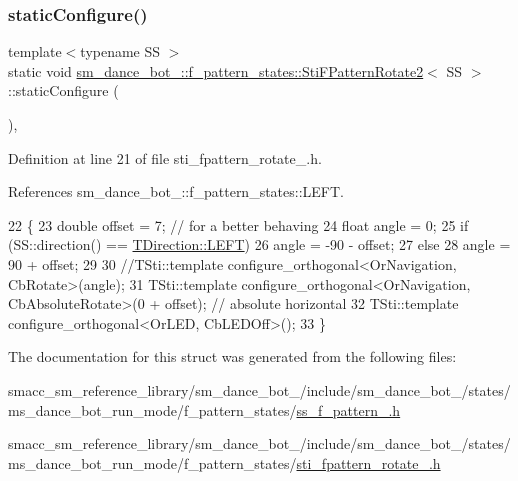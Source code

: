 \subsubsection{\texorpdfstring{static\+Configure()}{staticConfigure()}}
{\footnotesize\ttfamily template$<$typename SS $>$ \\
static void \hyperlink{classsm__dance__bot__2_1_1f__pattern__states_1_1StiFPatternRotate2}{sm\+\_\+dance\+\_\+bot\+\_\+::f\+\_\+pattern\+\_\+states\+::\+Sti\+F\+Pattern\+Rotate2}$<$ SS $>$\+::static\+Configure (\begin{DoxyParamCaption}{ }\end{DoxyParamCaption})\hspace{0.3cm}{\ttfamily [inline]}, {\ttfamily [static]}}



Definition at line 21 of file sti\+\_\+fpattern\+\_\+rotate\+\_.\+h.



References sm\+\_\+dance\+\_\+bot\+\_\+::f\+\_\+pattern\+\_\+states\+::\+L\+E\+FT.


\begin{DoxyCode}
22   \{
23     \textcolor{keywordtype}{double} offset = 7; \textcolor{comment}{// for a better behaving}
24     \textcolor{keywordtype}{float} angle = 0;
25     \textcolor{keywordflow}{if} (SS::direction() == \hyperlink{namespacesm__dance__bot__2_1_1f__pattern__states_ac1628c8b0522595fb6eb11d14875bceca684d325a7303f52e64011467ff5c5758}{TDirection::LEFT})
26       angle = -90 - offset;
27     \textcolor{keywordflow}{else}
28       angle = 90 + offset;
29 
30     \textcolor{comment}{//TSti::template configure\_orthogonal<OrNavigation, CbRotate>(angle);}
31     TSti::template configure\_orthogonal<OrNavigation, CbAbsoluteRotate>(0 + offset); \textcolor{comment}{// absolute horizontal}
32     TSti::template configure\_orthogonal<OrLED, CbLEDOff>();
33   \}
\end{DoxyCode}


The documentation for this struct was generated from the following files\+:\begin{DoxyCompactItemize}
\item 
smacc\+\_\+sm\+\_\+reference\+\_\+library/sm\+\_\+dance\+\_\+bot\+\_/include/sm\+\_\+dance\+\_\+bot\+\_/states/ms\+\_\+dance\+\_\+bot\+\_\+run\+\_\+mode/f\+\_\+pattern\+\_\+states/\hyperlink{2_2include_2sm__dance__bot__2_2states_2ms__dance__bot__run__mode_2f__pattern__states_2ss__f__pattern__1_8h}{ss\+\_\+f\+\_\+pattern\+\_.\+h}\item 
smacc\+\_\+sm\+\_\+reference\+\_\+library/sm\+\_\+dance\+\_\+bot\+\_/include/sm\+\_\+dance\+\_\+bot\+\_/states/ms\+\_\+dance\+\_\+bot\+\_\+run\+\_\+mode/f\+\_\+pattern\+\_\+states/\hyperlink{2_2include_2sm__dance__bot__2_2states_2ms__dance__bot__run__mode_2f__pattern__states_2sti__fpattern__rotate__2_8h}{sti\+\_\+fpattern\+\_\+rotate\+\_.\+h}\end{DoxyCompactItemize}
